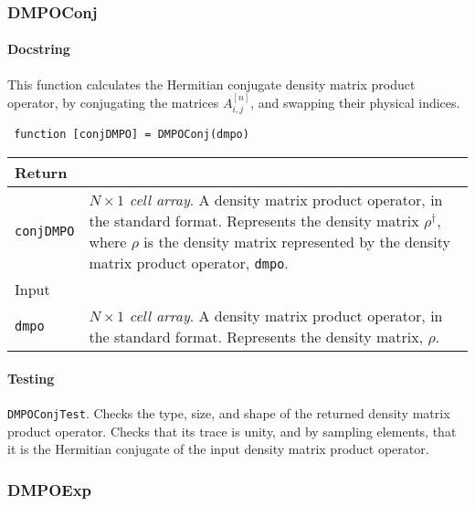  \subsubsection{DMPOConj}
 \paragraph{Docstring} This function calculates the Hermitian conjugate density matrix product operator, by conjugating the matrices \(A^{[n]}_{i,j}\), and swapping their physical indices.
 \begin{lstlisting}
 function [conjDMPO] = DMPOConj(dmpo) \end{lstlisting}
 \begin{longtabu}{X[1,l]X[4,l]}
 \hline
 Return & \\ \hline
 \lstinline$conjDMPO$ & \emph{\(N \times 1\) cell array}. A density matrix product operator, in the standard format. Represents the density matrix \(\rho^{\dagger}\), where \(\rho\) is the density matrix represented by the density matrix product operator, \lstinline$dmpo$. \\ \hline
 Input & \\ \hline
 \lstinline$dmpo$ & \emph{\(N \times 1\) cell array}. A density matrix product operator, in the standard format. Represents the density matrix, \(\rho\). \\
 \hline
 \end{longtabu}
 \paragraph{Testing} \lstinline$DMPOConjTest$. Checks the type, size, and shape of the returned density matrix product operator. Checks that its trace is unity, and by sampling elements, that it is the Hermitian conjugate of the input density matrix product operator.
 
 \subsubsection{DMPOExp}

